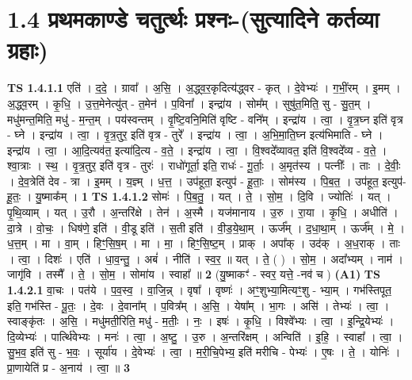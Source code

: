 \documentclass[17pt]{extarticle}
\begin{document}
\section*{ 1.4     प्रथमकाण्डे चतुर्त्थः प्रश्नः-(सुत्यादिने कर्तव्या ग्रहाः) }
                                \textbf{ TS 1.4.1.1} \newline
                  एति॑ । द॒दे॒ । ग्रावा᳚ । अ॒सि॒ । अ॒द्ध्व॒र॒कृदित्य॑द्ध्वर - कृत् । दे॒वेभ्यः॑ । ग॒भीं॒रम् । इ॒मम् । अ॒द्ध्व॒रम् । कृ॒धि॒ । उ॒त्त॒मेनेत्यु॑त् - त॒मेन॑ । प॒विना᳚ । इन्द्रा॑य । सोम᳚म् । सुषु॑त॒मिति॒ सु - सु॒त॒म् । मधु॑मन्त॒मिति॒ मधु॑ - म॒न्त॒म् । पय॑स्वन्तम् । वृ॒ष्टि॒वनि॒मिति॑ वृष्टि - वनि᳚म् । इन्द्रा॑य । त्वा॒ । वृ॒त्र॒घ्न इति॑ वृत्र - घ्ने । इन्द्रा॑य । त्वा॒ । वृ॒त्र॒तुर॒ इति॑ वृत्र - तुरे᳚ । इन्द्रा॑य । त्वा॒ । अ॒भि॒मा॒ति॒घ्न इत्य॑भिमाति - घ्ने । इन्द्रा॑य । त्वा॒ । आ॒दि॒त्यव॑त॒ इत्या॑दि॒त्य - व॒ते॒ । इन्द्रा॑य । त्वा॒ । वि॒श्वदे᳚व्यावत॒ इति॑ वि॒श्वदे᳚व्य - व॒ते॒ । श्वा॒त्राः । स्थ॒ । वृ॒त्र॒तुर॒ इति॑ वृत्र - तुरः॑ । राधो॑गूर्ता॒ इति॒ राधः॑ - गू॒र्ताः॒ । अ॒मृत॑स्य । पत्नीः᳚ । ताः । दे॒वीः॒ । दे॒व॒त्रेति॑ देव - त्रा । इ॒मम् । य॒ज्ञ्म् । ध॒त्त॒ । उप॑हूता॒ इत्युप॑ - हू॒ताः॒ । सोम॑स्य । पि॒ब॒त॒ । उप॑हूत॒ इत्युप॑-हू॒तः॒ । यु॒ष्माक᳚म् । \textbf{  1} \newline
                  \newline
                                \textbf{ TS 1.4.1.2} \newline
                  सोमः॑ । पि॒ब॒तु॒ । यत् । ते॒ । सो॒म॒ । दि॒वि । ज्योतिः॑ । यत् । पृ॒थि॒व्याम् । यत् । उ॒रौ । अ॒न्तरि॑क्षे । तेन॑ । अ॒स्मै । यज॑मानाय । उ॒रु । रा॒या । कृ॒धि॒ । अधीति॑ । दा॒त्रे । वो॒चः॒ । धिष॑णे॒ इति॑ । वी॒डू इति॑ । स॒ती इति॑ । वी॒ड॒ये॒था॒म् । ऊर्ज᳚म् । द॒धा॒था॒म् । ऊर्ज᳚म् । मे॒ । ध॒त्त॒म् । मा । वा॒म् । हिꣳ॒॒॒सि॒ष॒म् । मा । मा॒ । हिꣳ॒॒सि॒ष्ट॒म् । प्राक् । अपा᳚क् । उद॑क् । अ॒ध॒राक् । ताः । त्वा॒ । दिशः॑ । एति॑ । धा॒व॒न्तु॒ । अबं॑ । नीति॑ । स्व॒र॒ ॥ यत् । ते॒ ( ) । सो॒म॒ । अदा᳚भ्यम् । नाम॑ । जागृ॑वि । तस्मै᳚ । ते॒ । सो॒म॒ । सोमा॑य । स्वाहा᳚ ॥ \textbf{  2 } \newline
                  \newline
                      (यु॒ष्माकꣳ॑ - स्वर॒ यत्ते॒ -नव॑ च )  \textbf{(A1)} \newline \newline
                                \textbf{ TS 1.4.2.1} \newline
                  वा॒चः । पत॑ये । प॒व॒स्व॒ । वा॒जि॒न्न् । वृषा᳚ । वृष्णः॑ । अꣳ॒॒शुभ्या॒मित्यꣳ॒॒शु - भ्या॒म् । गभ॑स्तिपूत॒ इति॒ गभ॑स्ति - पू॒तः॒ । दे॒वः । दे॒वाना᳚म् । प॒वित्र᳚म् । अ॒सि॒ । येषा᳚म् । भा॒गः । असि॑ । तेभ्यः॑ । त्वा॒ । स्वाङ्कृ॑तः । अ॒सि॒ । मधु॑मती॒रिति॒ मधु॑ - म॒तीः॒ । नः॒ । इषः॑ । कृ॒धि॒ । विश्वे᳚भ्यः । त्वा॒ । इ॒न्द्रि॒येभ्यः॑ । दि॒व्येभ्यः॑ । पार्त्थि॑वेभ्यः । मनः॑ । त्वा॒ । अ॒ष्टु॒ । उ॒रु । अ॒न्तरि॑क्षम् । अन्विति॑ । इ॒हि॒ । स्वाहा᳚ । त्वा॒ । सु॒भ॒व॒ इति॑ सु - भ॒वः॒ । सूर्या॑य । दे॒वेभ्यः॑ । त्वा॒ । म॒री॒चि॒पेभ्य॒ इति॑ मरीचि - पेभ्यः॑ । ए॒षः । ते॒ । योनिः॑ । प्रा॒णायेति॑ प्र - अ॒नाय॑ । त्वा॒ ॥ \textbf{  3 } \newline
\end{document}
